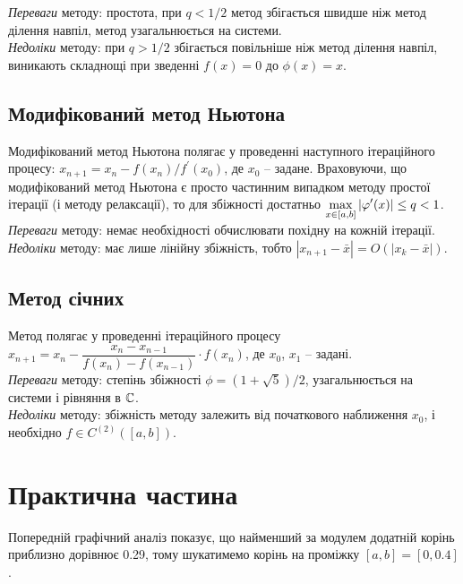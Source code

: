 \textit{Переваги} методу: простота, при $q < 1 / 2$ метод збігається швидше ніж метод ділення навпіл, метод узагальнюється на системи.\\

\textit{Недоліки} методу: при $q > 1 / 2$ збігається повільніше ніж метод ділення навпіл, виникають складнощі при зведенні $f(x) = 0$ до $\phi(x) = x$.

\subsection{Модифікований метод Ньютона}
Модифікований метод Ньютона полягає у проведенні наступного ітераційного процесу: $x_{n+1} = x_n - f(x_n) / f^\prime(x_0)$, де $x_0$ -- задане. Враховуючи, що модифікований метод Ньютона є просто частинним випадком методу простої ітерації (і методу релаксації), то для збіжності достатньо $\displaystyle\max\limits_{x\in[a,b]} |\varphi^\prime(x)| \le q < 1$.\\

\textit{Переваги} методу: немає необхідності обчислювати похідну на кожній ітерації.\\

\textit{Недоліки} методу: має лише лінійну збіжність, тобто $|x_{n+1} - \bar x| = O(|x_k - \bar x|)$.

\subsection{Метод січних}

Метод полягає у проведенні ітераційного процесу $x_{n+1} = x_n - \dfrac{x_n - x_{n-1}}{f(x_n) - f(x_{n-1})} \cdot f(x_n)$, де $x_0$, $x_1$ -- задані.\\

\textit{Переваги} методу: степінь збіжності $\phi = \left(1 + \sqrt 5\right) /2$, узагальнюється на системи і рівняння в $\mathbb{C}$.\\

\textit{Недоліки} методу: збіжність методу залежить від початкового наближення $x_0$, і необхідно $f\in C^{(2)}([a,b])$.


\section{Практична частина}

Попередній графічний аналіз показує, що найменший за модулем додатній корінь приблизно дорівнює 0.29, тому шукатимемо корінь на проміжку $[a, b] = [0, 0.4]$.


